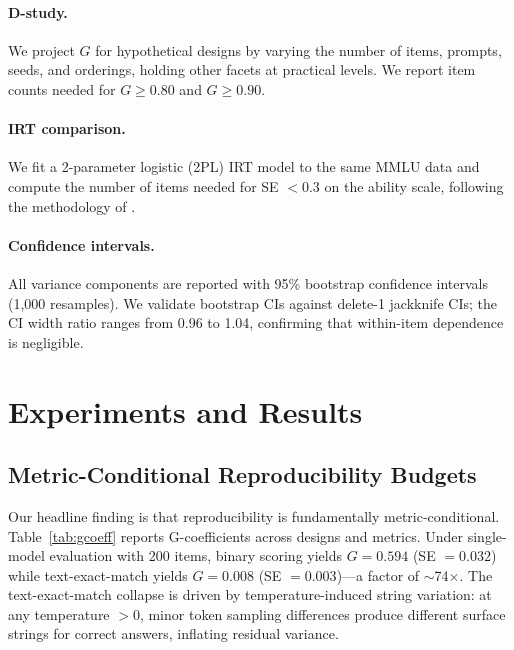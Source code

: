 \documentclass[letterpaper]{article}
\begin{document}
\paragraph{D-study.} We project $G$ for hypothetical designs by varying the number of items, prompts, seeds, and orderings, holding other facets at practical levels. We report item counts needed for $G \geq 0.80$ and $G \geq 0.90$.

\paragraph{IRT comparison.} We fit a 2-parameter logistic (2PL) IRT model to the same MMLU data and compute the number of items needed for SE $< 0.3$ on the ability scale, following the methodology of \citet{polo2024tinybenchmarks}.

\paragraph{Confidence intervals.} All variance components are reported with 95\% bootstrap confidence intervals (1,000 resamples). We validate bootstrap CIs against delete-1 jackknife CIs; the CI width ratio ranges from 0.96 to 1.04, confirming that within-item dependence is negligible.

\section{Experiments and Results}

\subsection{Metric-Conditional Reproducibility Budgets}
\label{sec:metric}

Our headline finding is that reproducibility is fundamentally metric-conditional. Table~\ref{tab:gcoeff} reports G-coefficients across designs and metrics. Under single-model evaluation with 200 items, binary scoring yields $G = 0.594$ (SE $= 0.032$) while text-exact-match yields $G = 0.008$ (SE $= 0.003$)---a factor of $\sim$74$\times$. The text-exact-match collapse is driven by temperature-induced string variation: at any temperature $> 0$, minor token sampling differences produce different surface strings for correct answers, inflating residual variance.
\end{document}
